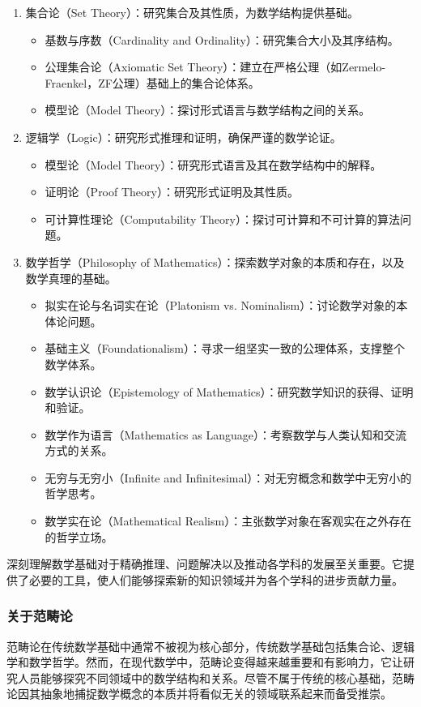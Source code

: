 \begin{enumerate}
  \item 集合论（Set Theory）：研究集合及其性质，为数学结构提供基础。
    \begin{itemize}
      \item 基数与序数（Cardinality and Ordinality）：研究集合大小及其序结构。
      \item 公理集合论（Axiomatic Set Theory）：建立在严格公理（如Zermelo-Fraenkel，ZF公理）基础上的集合论体系。
      \item 模型论（Model Theory）：探讨形式语言与数学结构之间的关系。
    \end{itemize}
    
  \item 逻辑学（Logic）：研究形式推理和证明，确保严谨的数学论证。
    \begin{itemize}
      \item 模型论（Model Theory）：研究形式语言及其在数学结构中的解释。
      \item 证明论（Proof Theory）：研究形式证明及其性质。
      \item 可计算性理论（Computability Theory）：探讨可计算和不可计算的算法问题。
    \end{itemize}
    
  \item 数学哲学（Philosophy of Mathematics）：探索数学对象的本质和存在，以及数学真理的基础。
    \begin{itemize}
      \item 拟实在论与名词实在论（Platonism vs. Nominalism）：讨论数学对象的本体论问题。
      \item 基础主义（Foundationalism）：寻求一组坚实一致的公理体系，支撑整个数学体系。
      \item 数学认识论（Epistemology of Mathematics）：研究数学知识的获得、证明和验证。
      \item 数学作为语言（Mathematics as Language）：考察数学与人类认知和交流方式的关系。
      \item 无穷与无穷小（Infinite and Infinitesimal）：对无穷概念和数学中无穷小的哲学思考。
      \item 数学实在论（Mathematical Realism）：主张数学对象在客观实在之外存在的哲学立场。
    \end{itemize}
\end{enumerate}

深刻理解数学基础对于精确推理、问题解决以及推动各学科的发展至关重要。它提供了必要的工具，使人们能够探索新的知识领域并为各个学科的进步贡献力量。

\subsubsection{关于范畴论}

范畴论在传统数学基础中通常不被视为核心部分，传统数学基础包括集合论、逻辑学和数学哲学。然而，在现代数学中，范畴论变得越来越重要和有影响力，它让研究人员能够探究不同领域中的数学结构和关系。尽管不属于传统的核心基础，范畴论因其抽象地捕捉数学概念的本质并将看似无关的领域联系起来而备受推崇。